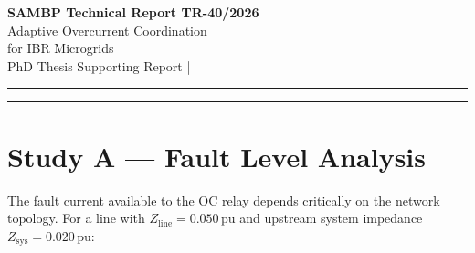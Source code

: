 \documentclass[11pt,a4paper]{article}
\begin{document}
\begin{center}
  {\LARGE\bfseries\color{sambpblue} SAMBP Technical Report TR-40/2026}\\[6pt]
  {\large Adaptive Overcurrent Coordination\\
    for IBR Microgrids}\\[10pt]
  {\normalsize PhD Thesis Supporting Report \quad|}
\end{center}

\vspace{2pt}\hrule\vspace{8pt}

\begin{abstract}
\noindent
This report develops an adaptive overcurrent (OC) coordination scheme for an
IBR microgrid that transitions between grid-connected and islanded operation
(TR-39~\cite{SAMBP_TR39}).  Islanding reduces the available fault current by
64\% (mid-line) to 72\% (far-end), rendering the grid-connected pickup setting
$I_{p,1}=1.50$\,pu insensitive to islanded faults.  A three-group adaptive
scheme is proposed: Group~1 (grid-connected, $I_{p}=1.50$\,pu, TMS\,$=0.10$),
Group~2 (islanded, $I_{p}=0.30$\,pu, TMS\,$=0.20$), and Group~3 (resync
window, $I_{p}=0.80$\,pu, TMS\,$=0.15$).  Setting group changes are triggered
by IEC~61850 GOOSE signals from the TR-39 islanding relay and the relay~25
sync-check element.  Coordination margin at the islanded fault level is 358\,ms
($>200$\,ms requirement).  The adaptive OC element operates for
$k_\mathrm{ibr}\geq0.0075$\,pu --- seven times more sensitive than the 87L
differential threshold --- providing robust coverage for near-zero IBR
contribution scenarios.
\end{abstract}

\vspace{4pt}\hrule\vspace{10pt}

\section{Study A --- Fault Level Analysis}
\label{sec:studyA}

The fault current available to the OC relay depends critically on the network
topology.  For a line with $Z_\mathrm{line}=0.050$\,pu and upstream system
impedance $Z_\mathrm{sys}=0.020$\,pu:
\end{document}
